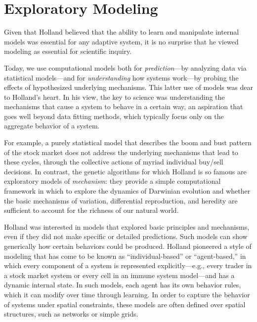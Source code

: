 \documentclass{sig-alternate}
\begin{document}

\section{Exploratory Modeling}

Given that Holland believed that the ability to learn and manipulate
internal models was essential for any adaptive system, it is no
surprise that he viewed modeling as essential for scientific inquiry.


Today, we use computational models both for \emph{prediction}---by
analyzing data via statistical models---and for \emph{understanding}
how systems work---by probing the effects of hypothesized underlying
mechanisms.  This latter use of models was dear to Holland's heart.
In his view, the key to science was understanding the mechanisms that
cause a system to behave in a certain way, an aspiration that goes
well beyond data fitting methods, which typically focus only on
the aggregate behavior of a system.  

For example, a purely statistical model that describes the boom and bust
pattern of the stock market
does not address the underlying mechanisms
that lead to these cycles, through the collective actions of myriad
individual buy/sell decisions.  
In contrast, the genetic algorithms for which Holland is so famous
are exploratory models of \emph{mechanism}: they provide a simple
computational framework in which to explore the dynamics of Darwinian
evolution and whether the basic mechanisms of variation, differential
reproduction, and heredity are sufficient to account for the richness
of our natural world.

Holland was interested in models that explored basic principles and
mechanisms, even if they did not make specific or detailed
predictions.  Such models can show generically how certain behaviors
could be produced.  Holland pioneered a style of modeling that has
come to be known as ``individual-based'' or ``agent-based,'' in which
every component of a system is represented explicitly---e.g., every
trader in a stock market system or every cell in an immune system
model---and has a dynamic internal state. In such models, each agent has
its own behavior rules, which it can modify over time through learning.  In
order to capture the behavior of systems under spatial
constraints, these models are often defined over spatial structures,
such as networks or simple grids.
\end{document}

